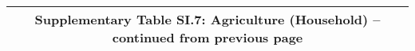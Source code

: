 \begin{longtable}{llcccccccccc}
\multicolumn{12}{c}{{\bfseries Supplementary Table SI.7: Agriculture (Household) -- continued from previous page}} \\ \hline                                                                                                                                                                                                                                                                                                                                                                                                                                                                                                                                                                                                                                                                                                                                                              

\end{longtable}
